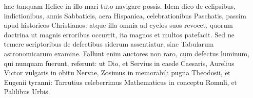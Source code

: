 hac tanquam Helice in illo mari tuto navigare possis.
Idem dico de eclipsibus, indictionibus, annis Sabbaticis,
 aera Hispanica,
celebrationibus Paschatis, passim apud historicos Christianos: atque
illa omnia ad cyclos suos revocet, quorum doctrina ut magnis erroribus
occurrit, ita magnos et multos patefacit.
Sed ne temere scriptoribus
de defectibus siderum assentiatur, sine Tabularum astronomicarum
examine.
Fallunt enim auctores non raro, cum defectus
luminum, qui nunquam fuerunt, referunt: ut Dio, et Servius in
caede Caesaris, Aurelius Victor vulgaris in obitu Nervae, Zosimus in
memorabili pugna Theodosii, et Eugenii tyranni: Tarrutius celeberrimus
Mathematicus in conceptu Romuli, et Palilibus Urbis.
{}

